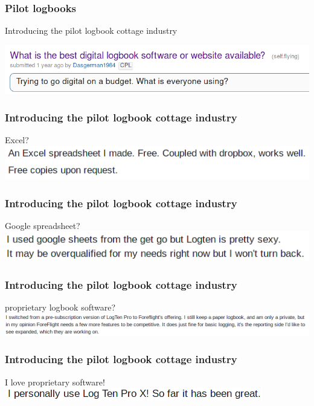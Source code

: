 \begin{frame}
\frametitle{Pilot logbooks}
\begin{center}
Introducing the pilot logbook cottage industry
\par
\includegraphics[height=0.1\textheight]{image/reddit-logbooks.png}
\end{center}
\end{frame}

\begin{frame}
\frametitle{Introducing the pilot logbook cottage industry}
\begin{block}{Excel?}
\includegraphics[height=0.1\textheight]{image/logbook-1.png}
\end{block}
\end{frame}

\begin{frame}
\frametitle{Introducing the pilot logbook cottage industry}
\begin{block}{Google spreadsheet?}
\includegraphics[height=0.1\textheight]{image/logbook-2.png}
\end{block}
\end{frame}

\begin{frame}
\frametitle{Introducing the pilot logbook cottage industry}
\begin{block}{proprietary logbook software?}
\includegraphics[height=0.08\textheight]{image/logbook-3.png}
\end{block}
\end{frame}

\begin{frame}
\frametitle{Introducing the pilot logbook cottage industry}
\begin{block}{I love proprietary software!}
\includegraphics[height=0.05\textheight]{image/logbook-4.png}
\end{block}
\end{frame}

